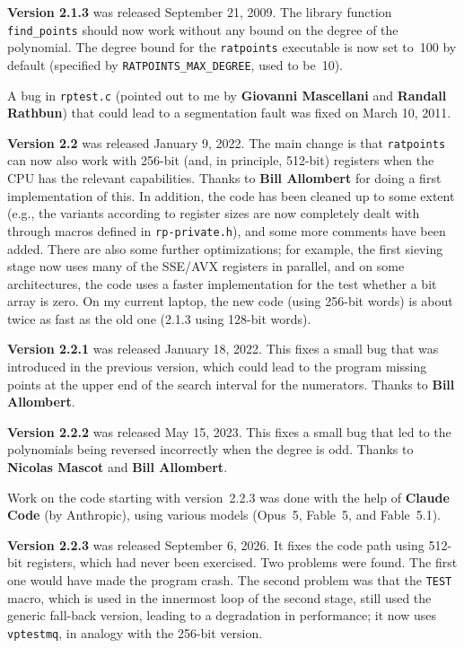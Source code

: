 \documentclass[12pt,a4paper,oneside]{amsart}
\begin{document}
\textbf{Version 2.1.3} was released September 21, 2009. The library function
\verb+find_points+ should now work without any bound on the degree of the
polynomial. The degree bound for the \texttt{ratpoints} executable is now set
to~100 by default (specified by \verb+RATPOINTS_MAX_DEGREE+, used to be~10).

A bug in \texttt{rptest.c} (pointed out to me by \textbf{Giovanni Mascellani}
and \textbf{Randall Rathbun}) that could lead to a segmentation fault was fixed on
March 10, 2011.

\textbf{Version 2.2} was released January 9, 2022. The main change is that
\texttt{ratpoints} can now also work with 256-bit (and, in principle, 512-bit)
registers when the CPU has the relevant capabilities. Thanks to
\textbf{Bill Allombert} for doing a first implementation of this. In addition,
the code has been cleaned up to some extent (e.g., the variants according
to register sizes are now completely dealt with through macros defined
in \texttt{rp-private.h}), and some more comments have been added.
There are also some further optimizations; for example, the first sieving
stage now uses many of the SSE/AVX registers in parallel, and on some
architectures, the code uses a faster implementation for the test whether
a bit array is zero. On my current laptop, the new code (using 256-bit words)
is about twice as fast as the old one (2.1.3 using 128-bit words).

\textbf{Version 2.2.1} was released January 18, 2022. This fixes a small
bug that was introduced in the previous version, which could lead to
the program missing points at the upper end of the search interval
for the numerators. Thanks to \textbf{Bill Allombert}.

\textbf{Version 2.2.2} was released May 15, 2023. This fixes a small
bug that led to the polynomials being reversed incorrectly when the
degree is odd. Thanks to \textbf{Nicolas Mascot} and \textbf{Bill Allombert}.

Work on the code starting with version~2.2.3 was done with the help
of \textbf{Claude Code} (by Anthropic), using various models
(Opus~5, Fable~5, and Fable~5.1).

\textbf{Version 2.2.3} was released September 6, 2026. It fixes the code
path using 512-bit registers, which had never been exercised. Two problems
were found. The first one would have made
the program crash. The second problem was that the \texttt{TEST} macro, which is
used in the innermost loop of the second stage, still used the generic
fall-back version, leading to a degradation in performance;
it now uses \texttt{vptestmq}, in analogy with the 256-bit version.
\end{document}
